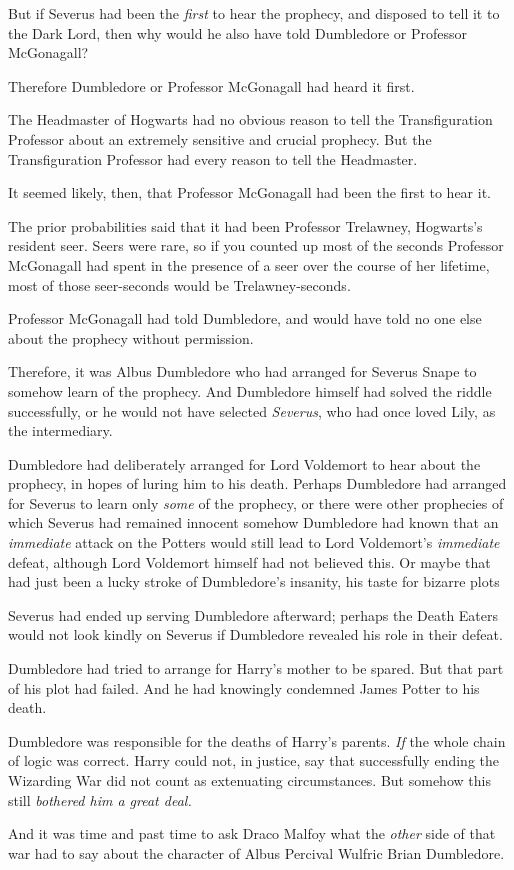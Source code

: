 But if Severus had been the \emph{first} to hear the prophecy, and disposed to
tell it to the Dark Lord, then why would he also have told Dumbledore or
Professor McGonagall?

Therefore Dumbledore or Professor McGonagall had heard it first.

The Headmaster of Hogwarts had no obvious reason to tell the Transfiguration
Professor about an extremely sensitive and crucial prophecy. But the
Transfiguration Professor had every reason to tell the Headmaster.

It seemed likely, then, that Professor McGonagall had been the first to hear it.

The prior probabilities said that it had been Professor Trelawney, Hogwarts's
resident seer. Seers were rare, so if you counted up most of the seconds
Professor McGonagall had spent in the presence of a seer over the course of her
lifetime, most of those seer-seconds would be Trelawney-seconds.

Professor McGonagall had told Dumbledore, and would have told no one else about
the prophecy without permission.

Therefore, it was Albus Dumbledore who had arranged for Severus Snape to
somehow learn of the prophecy. And Dumbledore himself had solved the riddle
successfully, or he would not have selected \emph{Severus}, who had once loved
Lily, as the intermediary.

Dumbledore had deliberately arranged for Lord Voldemort to hear about the
prophecy, in hopes of luring him to his death. Perhaps Dumbledore had arranged
for Severus to learn only \emph{some} of the prophecy, or there were other
prophecies of which Severus had remained innocent{\el} somehow Dumbledore
had known that an \emph{immediate} attack on the Potters would still lead to
Lord Voldemort's \emph{immediate} defeat, although Lord Voldemort himself had
not believed this. Or maybe that had just been a lucky stroke of Dumbledore's
insanity, his taste for bizarre plots{\el}

Severus had ended up serving Dumbledore afterward; perhaps the Death Eaters
would not look kindly on Severus if Dumbledore revealed his role in their
defeat.

Dumbledore had tried to arrange for Harry's mother to be spared. But that part
of his plot had failed. And he had knowingly condemned James Potter to his
death.

Dumbledore was responsible for the deaths of Harry's parents. \emph{If} the
whole chain of logic was correct. Harry could not, in justice, say that
successfully ending the Wizarding War did not count as extenuating
circumstances. But somehow this still{\el} \emph{bothered him a great deal.}

And it was time and past time to ask Draco Malfoy what the \emph{other} side of
that war had to say about the character of Albus Percival Wulfric Brian
Dumbledore.
